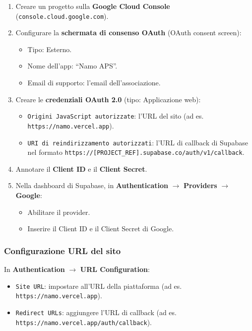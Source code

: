 \documentclass[a4paper,11pt,oneside]{book}
\newcommand{\campo}[1]{\texttt{#1}}
\begin{document}
\begin{enumerate}[leftmargin=1.5em]
  \item Creare un progetto sulla \textbf{Google Cloud Console} (\texttt{console.cloud.google.com}).
  \item Configurare la \textbf{schermata di consenso OAuth} (OAuth consent screen):
    \begin{itemize}
      \item Tipo: Esterno.
      \item Nome dell'app: ``Namo APS''.
      \item Email di supporto: l'email dell'associazione.
    \end{itemize}
  \item Creare le \textbf{credenziali OAuth 2.0} (tipo: Applicazione web):
    \begin{itemize}
      \item \campo{Origini JavaScript autorizzate}: l'URL del sito (ad es. \texttt{https://namo.vercel.app}).
      \item \campo{URI di reindirizzamento autorizzati}: l'URL di callback di Supabase nel formato \texttt{https://[PROJECT\_REF].supabase.co/auth/v1/callback}.
    \end{itemize}
  \item Annotare il \textbf{Client ID} e il \textbf{Client Secret}.
  \item Nella dashboard di Supabase, in \textbf{Authentication} $\rightarrow$ \textbf{Providers} $\rightarrow$ \textbf{Google}:
    \begin{itemize}
      \item Abilitare il provider.
      \item Inserire il Client ID e il Client Secret di Google.
    \end{itemize}
\end{enumerate}

\subsubsection{Configurazione URL del sito}

In \textbf{Authentication} $\rightarrow$ \textbf{URL Configuration}:

\begin{itemize}[leftmargin=1.5em]
  \item \campo{Site URL}: impostare all'URL della piattaforma (ad es. \texttt{https://namo.vercel.app}).
  \item \campo{Redirect URLs}: aggiungere l'URL di callback (ad es. \texttt{https://namo.vercel.app/auth/callback}).
\end{itemize}
\end{document}
